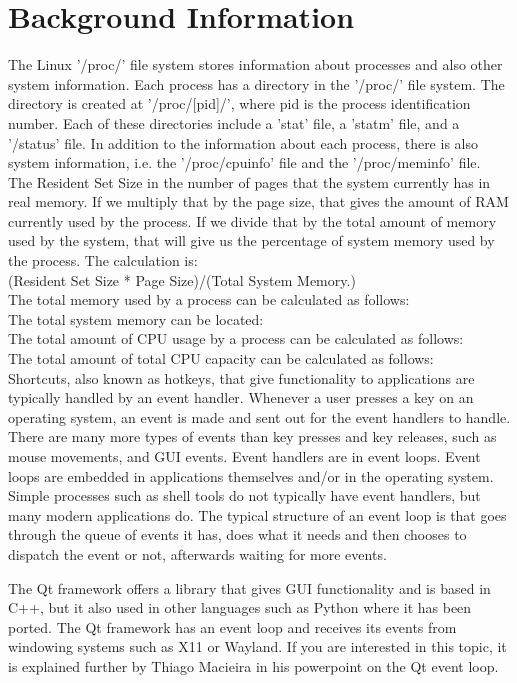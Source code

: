 \documentclass[12pt]{article}
\begin{document}
	\section{Background Information}
	The Linux '/proc/' file system stores information about processes and also other system information. Each process has a directory in the '/proc/' file system\cite[p. 792]{text}. The directory is created at '/proc/[pid]/', where pid is the process identification number. Each of these directories include a 'stat' file, a 'statm' file, and a '/status' file. In addition to the information about each process, there is also system information, i.e. the '/proc/cpuinfo' file and the '/proc/meminfo' file.\\
	The Resident Set Size in the number of pages that the system currently has in real memory.
	If we multiply that by the page size, that gives the amount of RAM currently used by the process.
	If we divide that by the total amount of memory used by the system, that will give us the percentage of system memory used by the process.
	The calculation is:\\
	(Resident Set Size * Page Size)/(Total System Memory.)\\
	The total memory used by a process can be calculated as follows:\\
	The total system memory can be located:\\
	The total amount of CPU usage by a process can be calculated as follows:\\
	The total amount of total CPU capacity can be calculated as follows:\\
	
Shortcuts, also known as hotkeys, that give functionality to applications are typically handled by an event handler.
Whenever a user presses a key on an operating system, an event is made and sent out for the event handlers to handle.
There are many more types of events than key presses and key releases, such as mouse movements, and GUI events.
Event handlers are in event loops. Event loops are embedded in applications themselves and/or in the operating system. Simple processes such as shell tools do not typically have event handlers, but many modern applications do. The typical structure of an event loop is that goes through the queue of events it has, does what it needs and then chooses to dispatch the event or not, afterwards waiting for more events. 

The Qt framework offers a library that gives GUI functionality and is based in C++, but it also used in other languages such as Python where it has been ported.
The Qt framework has an event loop and receives its events from windowing systems such as X11 or Wayland.
If you are interested in this topic, it is explained further by Thiago Macieira in his powerpoint on the Qt event loop\cite{QtSlides}.
\end{document}
